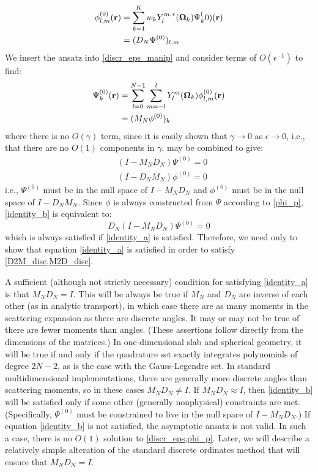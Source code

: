 \begin{equation}
\begin{split}
\phi_{l,m}^{(0)}(\br) &= \sum_{k=1}^K w_k Y_l^{m,*}(\bo_k) \Psi_k^(0)(\br)\\ 
&= (D_N\Psi^{(0)})_{l,m}
\end{split}
\label{D2M_disc}
\end{equation}
We insert the ansatz into \cref{discr_eps_manip} and consider terms
of $O(\epsilon^{-1})$ to find:
\begin{equation}
\begin{split}
\Psi_k^{(0)}(\br) &=\sum_{l=0}^{N-1} \sum_{m=-l}^l Y_l^m(\bo_k) 
\phi_{l,m}^{(0)}(\br)\\
&= (M_N\phi^{(0)})_k
\end{split}
\label{M2D_disc}
\end{equation}
where there is no $O(\gamma)$ term, since it is easily shown that
$\gamma\rightarrow 0$ as $\epsilon\rightarrow 0$, i.e., that there are no
$O(1)$ components in $\gamma$.  may be combined to give:
\begin{align}
&(I-M_ND_N)\Psi^{(0)} = 0 \label{identity_a}\\
&(I-D_NM_N)\phi^{(0)} = 0 \label{identity_b}
\end{align}
i.e., $\Psi^{(0)}$ must be in the null space of $I-M_N D_N$ and $\phi^{(0)}$
must be in the null space of $I-D_N M_N$. Since $\phi$ is always constructed
from $\Psi$ according to \cref{phi_p}, \cref{identity_b}
is equivalent to:
\begin{equation}
D_N(I-M_N D_N)\Psi^{(0)} = 0
\end{equation}
which is always satisfied if \cref{identity_a} is satisfied.
Therefore, we need only to show that equation \cref{identity_a} is satisfied
in order to satisfy \cref{D2M_disc,M2D_disc}.

A sufficient (although not strictly necessary) condition for satisfying
\cref{identity_a} is that $M_ND_N=I$. This will be always be true if
$M_N$ and $D_N$ are inverse of each other (as in analytic transport), in which
case there are as many moments in the scattering expansion as there are
discrete angles. It may or may not be true of there are fewer moments than
angles. (These assertions follow directly from the dimensions of the
matrices.) In one-dimensional slab and spherical geometry, it will be true if
and only if the quadrature set exactly integrates polynomials of degree
$2N-2$, as is the case with the Gauss-Legendre set. In standard
multidimensional implementations, there are generally more discrete angles
than scattering moments, so in these cases $M_N D_N \neq I$. If $M_N
D_N\approx I$, then \cref{identity_b} will be satisfied only if some
other (generally nonphysical) constraints are met. (Specifically, $\Psi^{(0)}$
must be constrained to live in the null space of $I-M_N D_N$.) If equation
\cref{identity_b} is not satisfied, the asymptotic ansatz is not valid. In
such a case, there is no $O(1)$ solution to \cref{discr_eps,phi_p}. Later, we will 
describe a relatively simple alteration of the
standard discrete ordinates method that will ensure that $M_N D_N = I$.


